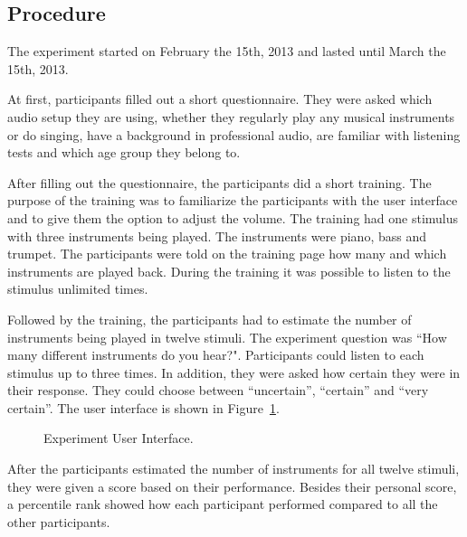 \subsection{Procedure}\label{sec:procedure}
The experiment started on February the 15th, 2013 and lasted until March the 15th, 2013. %

At first, participants filled out a short questionnaire. They were asked which audio setup they are using, whether they regularly play any musical instruments or do singing, have a background in professional audio, are familiar with listening tests and which age group they belong to.

After filling out the questionnaire, the participants did a short training. The purpose of the training was to familiarize the participants with the user interface and to give them the option to adjust the volume. The training had one stimulus with three instruments being played. The instruments were piano, bass and trumpet. The participants were told on the training page how many and which instruments are played back. During the training it was possible to listen to the stimulus unlimited times.

Followed by the training, the participants had to estimate the number of instruments being played in twelve stimuli. The experiment question was ``How many different instruments do you hear?". Participants could listen to each stimulus up to three times. In addition, they were asked how certain they were in their response. They could choose between ``uncertain'', ``certain'' and ``very certain''. The user interface is shown in Figure~\ref{figure:user_interface}.

\begin{figure}[htb]
	\centering
	\caption{Experiment User Interface.}
	\label{figure:user_interface}
\end{figure}

After the participants estimated the number of instruments for all twelve stimuli, they were given a score based on their performance. Besides their personal score, a percentile rank showed how each participant performed compared to all the other participants.

